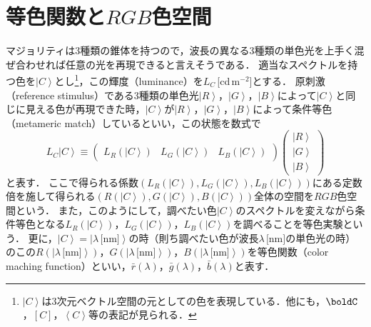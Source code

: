 \documentclass[uplatex,paper=a4,fontsize=4.0truemm,jafontsize=4.0truemm,head_space=30.0truemm,foot_space=30.0truemm,baselineskip=8.0truemm,line_length=40zw,gutter=25.0truemm,oneside,openany,fleqn,hanging_panctuation,open_bracket_pos=nibu_tentsuki,dvipdfmx,jis2004,book,titlepage]{jlreq}
\theoremstyle{mystyle}
\newcommand{\mathdisplaystyle}[1]{\(\displaystyle{#1}\)}
\newcommand{\negativevalue}[1]{{-#1}}
\newcommand{\parentheses}[1]{\left(#1\right)}
\newcommand{\squarebrackets}[1]{\left[#1\right]}
\newcommand{\anglebrackets}[1]{\left\langle#1\right\rangle}
\newcommand{\Diracket}[1]{\left\lvert#1\right\rangle}
\newcommand{\easymatrix}[1]{\mathord{\begin{pmatrix}#1\end{pmatrix}}}
\begin{document}
		\section{等色関数と\mathdisplaystyle{RGB}色空間}
			マジョリティは3種類の錐体を持つので，波長の異なる3種類の単色光を上手く混ぜ合わせれば任意の光を再現できると言えそうである．
			適当なスペクトルを持つ色を\mathdisplaystyle{\Diracket{C}}とし\footnote{\mathdisplaystyle{\Diracket{C}}は3次元ベクトル空間の元としての色を表現している．他にも，\mathdisplaystyle{\boldC}，\mathdisplaystyle{\squarebrackets{C}}，\mathdisplaystyle{\anglebrackets{C}}等の表記が見られる．}，この輝度（luminance）を\mathdisplaystyle{L_C}\,[cd\,\mathdisplaystyle{\textrm{m}^\negativevalue{2}}]とする．
			原刺激（reference stimulus）である3種類の単色光\mathdisplaystyle{\Diracket{R}}，\mathdisplaystyle{\Diracket{G}}，\mathdisplaystyle{\Diracket{B}}によって\mathdisplaystyle{\Diracket{C}}と同じに見える色が再現できた時，\mathdisplaystyle{\Diracket{C}}が\mathdisplaystyle{\Diracket{R}}，\mathdisplaystyle{\Diracket{G}}，\mathdisplaystyle{\Diracket{B}}によって条件等色（metameric match）しているといい，この状態を数式で
			\begin{equation*}
				L_C\Diracket{C}\equiv\easymatrix{L_R\parentheses{\Diracket{C}} & L_G\parentheses{\Diracket{C}} & L_B\parentheses{\Diracket{C}}}\easymatrix{\Diracket{R} \\ \Diracket{G} \\ \Diracket{B}}
			\end{equation*}
			と表す．
			ここで得られる係数\mathdisplaystyle{\parentheses{L_R\parentheses{\Diracket{C}},L_G\parentheses{\Diracket{C}},L_B\parentheses{\Diracket{C}}}}にある定数倍を施して得られる\mathdisplaystyle{\parentheses{R\parentheses{\Diracket{C}},G\parentheses{\Diracket{C}},B\parentheses{\Diracket{C}}}}全体の空間を\mathdisplaystyle{RGB}色空間という．
			また，このようにして，調べたい色\mathdisplaystyle{\Diracket{C}}のスペクトルを変えながら条件等色となる\mathdisplaystyle{L_R\parentheses{\Diracket{C}}}，\mathdisplaystyle{L_G\parentheses{\Diracket{C}}}，\mathdisplaystyle{L_B\parentheses{\Diracket{C}}}を調べることを等色実験という．
			更に，\mathdisplaystyle{\Diracket{C}=\Diracket{\lambda\,\textrm{[nm]}}}の時（則ち調べたい色が波長\mathdisplaystyle{\lambda\,\textrm{[nm]}}の単色光の時）のこの\mathdisplaystyle{R\parentheses{\Diracket{\lambda\,\textrm{[nm]}}}}，\mathdisplaystyle{G\parentheses{\Diracket{\lambda\,\textrm{[nm]}}}}，\mathdisplaystyle{B\parentheses{\Diracket{\lambda\,\textrm{[nm]}}}}を等色関数（color maching function）といい，\mathdisplaystyle{\bar{r}\parentheses{\lambda}}，\mathdisplaystyle{\bar{g}\parentheses{\lambda}}，\mathdisplaystyle{\bar{b}\parentheses{\lambda}}と表す．
\end{document}
